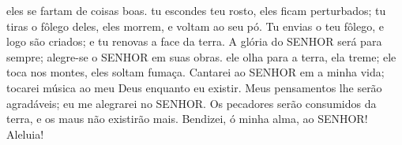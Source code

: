 {{} eles se fartam de coisas boas.
   tu escondes teu rosto, eles ficam perturbados;
{} tu tiras o fôlego deles,
{} eles morrem, e voltam ao seu pó.
  Tu envias o teu fôlego, e logo são criados; e
{} tu renovas a face da terra.
  A glória do SENHOR será para sempre; alegre-se o SENHOR em suas obras.
   ele olha para a terra,
{} ela treme;
{} ele toca nos montes, eles soltam fumaça.
  Cantarei ao SENHOR em
{} a minha vida; tocarei música ao meu Deus enquanto eu existir.
  Meus pensamentos lhe serão agradáveis; eu me alegrarei no SENHOR.
  Os pecadores serão consumidos da terra, e os maus não existirão mais. Bendizei, ó minha alma, ao SENHOR! Aleluia!
\par }

